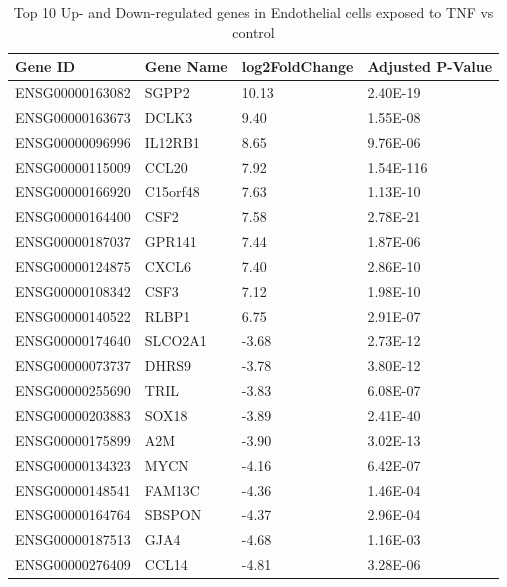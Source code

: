 \begin{table}[h!t]
    \footnotesize
    \label{table:genesendo}
	\centering
	\begin{tabular}{|ll|ll|}
		\hline
		Gene ID & Gene Name & log2FoldChange &Adjusted P-Value \\ \hline

		\hline
		ENSG00000163082 & SGPP2    & 10.13 & 2.40E-19 \\
		ENSG00000163673 & DCLK3    & 9.40  & 1.55E-08 \\
		ENSG00000096996 & IL12RB1  & 8.65  & 9.76E-06 \\
		ENSG00000115009 & CCL20    & 7.92  & 1.54E-116 \\
		ENSG00000166920 & C15orf48 & 7.63  & 1.13E-10 \\
		ENSG00000164400 & CSF2     & 7.58  & 2.78E-21 \\
		ENSG00000187037 & GPR141   & 7.44  & 1.87E-06 \\
		ENSG00000124875 & CXCL6    & 7.40  & 2.86E-10 \\
		ENSG00000108342 & CSF3     & 7.12  & 1.98E-10 \\
		ENSG00000140522 & RLBP1    & 6.75  & 2.91E-07 \\
		ENSG00000174640 & SLCO2A1  & -3.68 & 2.73E-12 \\
		ENSG00000073737 & DHRS9    & -3.78 & 3.80E-12 \\
		ENSG00000255690 & TRIL     & -3.83 & 6.08E-07 \\
		ENSG00000203883 & SOX18    & -3.89 & 2.41E-40 \\
		ENSG00000175899 & A2M      & -3.90 & 3.02E-13 \\
		ENSG00000134323 & MYCN     & -4.16 & 6.42E-07 \\
		ENSG00000148541 & FAM13C   & -4.36 & 1.46E-04 \\
		ENSG00000164764 & SBSPON   & -4.37 & 2.96E-04 \\
		ENSG00000187513 & GJA4     & -4.68 & 1.16E-03 \\
		ENSG00000276409 & CCL14    & -4.81 & 3.28E-06 \\\hline
	\end{tabular}
    \caption{Top 10 Up- and Down-regulated genes in Endothelial cells exposed to TNF vs control}
\end{table}

